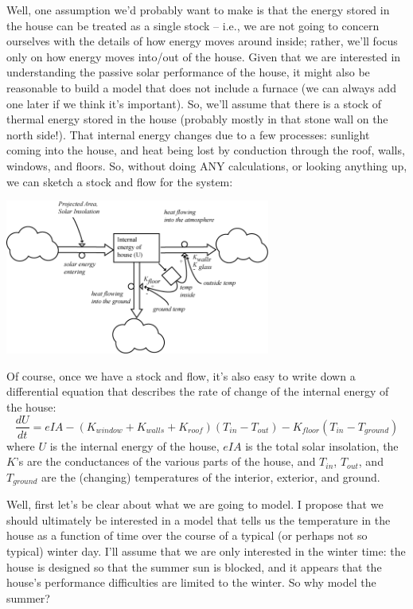 \documentclass[10pt]{book}
\newcommand{\beforefig}{\vspace{0.2in}}
\newcommand{\afterfig}{\vspace{0.2in}}
\begin{document}
Well, one assumption we'd probably want to make is that the energy stored in the house can be treated as a single stock -- i.e., we are not going to concern ourselves with the details of how energy moves around inside; rather, we'll focus only on how energy moves into/out of the house.  Given that we are interested in understanding the passive solar performance of the house, it might also be reasonable to build a model that does not include a furnace (we can always add one later if we think it's important).   So, we'll assume that there is a stock of thermal energy stored in the house (probably mostly in that stone wall on the north side!). That internal energy changes due to a few processes:  sunlight coming into the house, and heat being lost by conduction through the roof, walls, windows, and floors. So, without doing ANY calculations, or looking anything up, we can sketch a stock and flow for the system:

\beforefig
 \centerline{\includegraphics[height=2in]{figs/JacobsModel}}
\afterfig

Of course, once we have a stock and flow, it's also easy to write down a differential equation that describes the rate of change of the internal energy of the house:
$$\frac{dU}{dt} = eIA - (K_{window}+K_{walls}+K_{roof})(T_{in}-T_{out}) - K_{floor}(T_{in}-T_{ground})$$
where $U$ is the internal energy of the house, $eIA$ is the total solar insolation, the $K$'s are the conductances of the various parts of the house, and $T_{in}$, $T_{out}$, and $T_{ground}$ are the (changing) temperatures of the interior, exterior, and ground.




Well, first let's be clear about what we are going to model.  I propose that we should ultimately be interested in a model that tells us the temperature in the house as a function of time over the course of a typical (or perhaps not so typical) winter day.  I'll assume that we are only interested in the winter time:  the house is designed so that the summer sun is blocked,  and it appears that the house's performance difficulties are limited to the winter.  So why model the summer?
\end{document}
